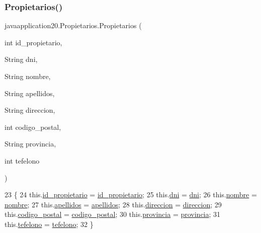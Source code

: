\subsubsection{\texorpdfstring{Propietarios()}{Propietarios()}}
{\footnotesize\ttfamily javaapplication20.\+Propietarios.\+Propietarios (\begin{DoxyParamCaption}\item[{int}]{id\+\_\+propietario,  }\item[{String}]{dni,  }\item[{String}]{nombre,  }\item[{String}]{apellidos,  }\item[{String}]{direccion,  }\item[{int}]{codigo\+\_\+postal,  }\item[{String}]{provincia,  }\item[{int}]{tefelono }\end{DoxyParamCaption})\hspace{0.3cm}{\ttfamily [inline]}}


\begin{DoxyCode}
23                                                                                                            
                                                         \{
24         this.\mbox{\hyperlink{classjavaapplication20_1_1_propietarios_a0d9654913e9342d45346e4b8086c99fd}{id\_propietario}} = \mbox{\hyperlink{classjavaapplication20_1_1_propietarios_a0d9654913e9342d45346e4b8086c99fd}{id\_propietario}};
25         this.\mbox{\hyperlink{classjavaapplication20_1_1_propietarios_ab18a08d3653627babc033432dbb281e8}{dni}} = \mbox{\hyperlink{classjavaapplication20_1_1_propietarios_ab18a08d3653627babc033432dbb281e8}{dni}};
26         this.\mbox{\hyperlink{classjavaapplication20_1_1_propietarios_a829d4d9b2f229a3b406b426fe3af9f18}{nombre}} = \mbox{\hyperlink{classjavaapplication20_1_1_propietarios_a829d4d9b2f229a3b406b426fe3af9f18}{nombre}};
27         this.\mbox{\hyperlink{classjavaapplication20_1_1_propietarios_a9b897b9be023e6bfe54f693f6abd4990}{apellidos}} = \mbox{\hyperlink{classjavaapplication20_1_1_propietarios_a9b897b9be023e6bfe54f693f6abd4990}{apellidos}};
28         this.\mbox{\hyperlink{classjavaapplication20_1_1_propietarios_a65fcf66e9d2944122d66c3ea3593feb5}{direccion}} = \mbox{\hyperlink{classjavaapplication20_1_1_propietarios_a65fcf66e9d2944122d66c3ea3593feb5}{direccion}};
29         this.\mbox{\hyperlink{classjavaapplication20_1_1_propietarios_a3b56a934dce029ef1cb5d5f61d189538}{codigo\_postal}} = \mbox{\hyperlink{classjavaapplication20_1_1_propietarios_a3b56a934dce029ef1cb5d5f61d189538}{codigo\_postal}};
30         this.\mbox{\hyperlink{classjavaapplication20_1_1_propietarios_a4d34e2698807c08fa013a2a24fb0aecf}{provincia}} = \mbox{\hyperlink{classjavaapplication20_1_1_propietarios_a4d34e2698807c08fa013a2a24fb0aecf}{provincia}};
31         this.\mbox{\hyperlink{classjavaapplication20_1_1_propietarios_aed6eadeca2eaedfde708ff2b39606bf9}{tefelono}} = \mbox{\hyperlink{classjavaapplication20_1_1_propietarios_aed6eadeca2eaedfde708ff2b39606bf9}{tefelono}};
32     \}
\end{DoxyCode}


